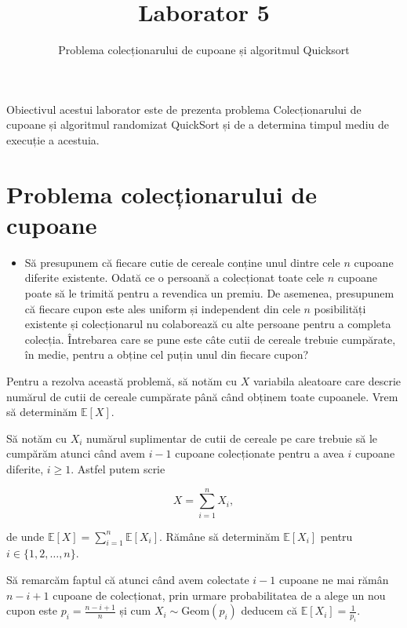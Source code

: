 \documentclass[]{article}
\title{Laborator 5}
\subtitle{Problema colecționarului de cupoane și algoritmul Quicksort}
\author{}
\date{}
\newenvironment{frshaded*}{%
  \def\FrameCommand{\fboxrule=\FrameRule\fboxsep=\FrameSep \fcolorbox{framecolor}{shadecolor1}}%
  \MakeFramed {\advance\hsize-\width \FrameRestore}}%
{\endMakeFramed}
\newenvironment{rmdblock}[1]
  {\begin{frshaded*}
  \begin{itemize}
  \renewcommand{\labelitemi}{
    \raisebox{-.7\height}[0pt][0pt]{
      {\setkeys{Gin}{width=2em,keepaspectratio}\texttt{[image: images/icons/\#1]}}
    }
  }
  \item
  }
  {
  \end{itemize}
  \end{frshaded*}
  }
\newenvironment{rmdexercise}
  {\begin{rmdblock}{exercise}}
  {\end{rmdblock}}
\begin{document}
\maketitle

\thispagestyle{fancy}

Obiectivul acestui laborator este de prezenta problema Colecționarului
de cupoane și algoritmul randomizat QuickSort și de a determina timpul
mediu de execuție a acestuia.

\hypertarget{problema-colecux21bionarului-de-cupoane}{%
\section{Problema colecționarului de
cupoane}\label{problema-colecux21bionarului-de-cupoane}}

\begin{rmdexercise}
Să presupunem că fiecare cutie de cereale conține unul dintre cele \(n\)
cupoane diferite existente. Odată ce o persoană a colecționat toate cele
\(n\) cupoane poate să le trimită pentru a revendica un premiu. De
asemenea, presupunem că fiecare cupon este ales uniform și independent
din cele \(n\) posibilități existente și colecționarul nu colaborează cu
alte persoane pentru a completa colecția. Întrebarea care se pune este
câte cutii de cereale trebuie cumpărate, în medie, pentru a obține cel
puțin unul din fiecare cupon?
\end{rmdexercise}

Pentru a rezolva această problemă, să notăm cu \(X\) variabila aleatoare
care descrie numărul de cutii de cereale cumpărate până când obținem
toate cupoanele. Vrem să determinăm \(\mathbb{E}[X]\).

Să notăm cu \(X_i\) numărul suplimentar de cutii de cereale pe care
trebuie să le cumpărăm atunci când avem \(i-1\) cupoane colecționate
pentru a avea \(i\) cupoane diferite, \(i\geq 1\). Astfel putem scrie

\[
  X = \sum_{i = 1}^{n}X_i,
\]

de unde \(\mathbb{E}[X] = \sum_{i = 1}^{n}\mathbb{E}[X_i]\). Rămâne să
determinăm \(\mathbb{E}[X_i]\) pentru \(i\in\{1,2,\ldots,n\}\).

Să remarcăm faptul că atunci când avem colectate \(i-1\) cupoane ne mai
rămân \(n-i+1\) cupoane de colecționat, prin urmare probabilitatea de a
alege un nou cupon este \(p_i=\frac{n-i+1}{n}\) și cum
\(X_i\sim\text{Geom}(p_i)\) deducem că
\(\mathbb{E}[X_i] = \frac{1}{p_i}\).
\end{document}
